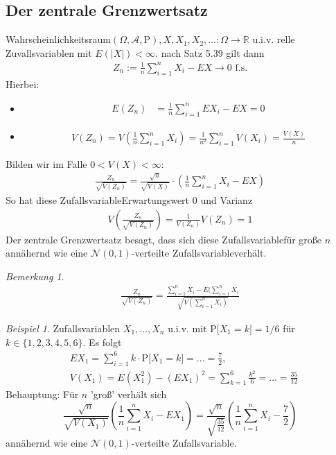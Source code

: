 \documentclass[a4paper,12pt,fleqn]{scrartcl}
\newcommand{\R}{\mathbb{R}}
\newcommand{\m}[1]{\mathcal{ #1 }}
\newcommand{\pe}[1]{\text{P[} #1 \text{]}}
\newcommand{\WR}{Wahrscheinlichkeitsraum}
\newcommand{\ZV}{Zufallsvariable}
\theoremstyle{definition}
\theoremstyle{plain}
\theoremstyle{remark}
\newtheorem*{bemerkung}{Bemerkung}
\newtheorem*{beispiel*}{Beispiel}
\begin{document}
\subsection{Der zentrale Grenzwertsatz}
\WR $(\Omega,\m{A},\text{P}), X,X_1,X_2,\ldots:\Omega\to\R$ u.i.v. relle Zuvallsvariablen mit $E(|X|)<\infty$. nach Satz 5.39 gilt dann
\begin{align*}
Z_n:=\frac{1}{n}\sum_{i=1}^nX_i-EX\to 0\text{ f.s.}
\end{align*}
Hierbei:
\begin{itemize}
\item
\begin{align*}
E(Z_n)&=\frac{1}{n}\sum_{i=1}^nEX_i-EX=0
\end{align*}
\item
\begin{align*}
V(Z_n)=V(\frac{1}{n}\sum_{i=1}^nX_i)=\frac{1}{n^2}\sum_{i=1}^nV(X_i)=\frac{V(X)}{n}
\end{align*}
\end{itemize}
Bilden wir im Falle $0<V(X)<\infty$:
\begin{align*}
\frac{Z_n}{\sqrt{V(Z_n)}}=\frac{\sqrt{n}}{\sqrt{V(X)}}\cdot(\frac{1}{n}\sum_{i=1}^nX_i-EX)
\end{align*}
So hat diese \ZV Erwartungswert $0$ und Varianz
\begin{align*}
V(\frac{Z_n}{\sqrt{V(Z_n)}})=\frac{1}{V(Z_n)}V(Z_n)=1
\end{align*}
Der zentrale Grenzwertsatz besagt, dass sich diese \ZV für große $n$ annähernd wie eine $\m{N}(0,1)$-verteilte \ZV verhält.
\begin{bemerkung}
\begin{align*}
\frac{Z_n}{\sqrt{V(Z_n)}}=\frac{\sum_{i=1}^nX_i-E(\sum_{i=1}^nX_i}{\sqrt{V(\sum_{i=1}^nX_i)}}
\end{align*}
\end{bemerkung}
\begin{beispiel*}
Zufallsvariablen $X_1,\ldots,X_n$ u.i.v. mit $\pe{X_1=k}=1/6$ für $k\in\{ 1,2,3,4,5,6\}$. Es folgt
\begin{align*}
&EX_1=\sum_{i=1}^6k\cdot\pe{X_1=k}=\ldots=\frac{7}{2},\\
&V(X_1)=E(X_1^2)-(EX_1)^2=\sum_{k=1}^6\frac{k^2}{6}=\ldots=\frac{35}{12}
\end{align*}
Behauptung: Für $n$ 'groß' verhält sich
\[\frac{\sqrt{n}}{\sqrt{V(X_1)}}(\frac{1}{n}\sum_{i=1}^nX_i-EX_1)=\frac{\sqrt{n}}{\sqrt{\frac{35}{12}}}(\frac{1}{n}\sum_{i=1}^nX_i-\frac{7}{2})\]
annähernd wie eine $\m{N}(0,1)$-verteilte \ZV.
\end{beispiel*}
\end{document}
